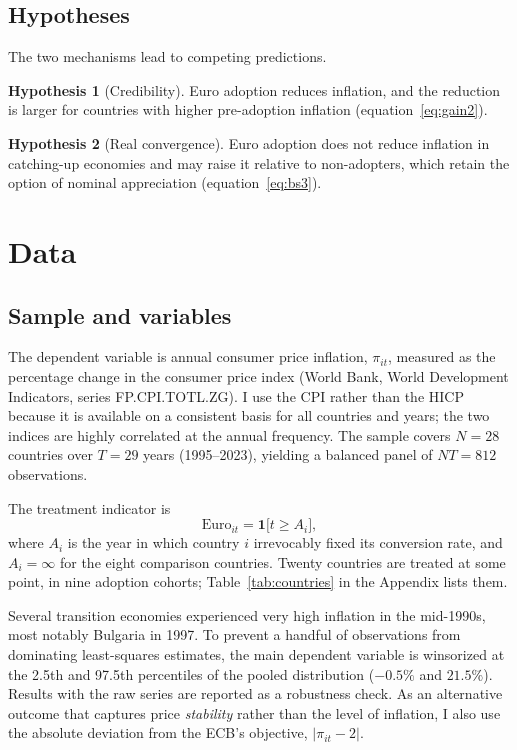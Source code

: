 \documentclass[11pt,a4paper]{article}
\numberwithin{equation}{section}
\theoremstyle{definition}
\newtheorem{hypothesis}{Hypothesis}
\theoremstyle{remark}
\begin{document}
\subsection{Hypotheses}
The two mechanisms lead to competing predictions.

\begin{hypothesis}[Credibility]\label{h1}
Euro adoption reduces inflation, and the reduction is larger for countries with higher pre-adoption inflation (equation~\ref{eq:gain2}).
\end{hypothesis}

\begin{hypothesis}[Real convergence]\label{h2}
Euro adoption does not reduce inflation in catching-up economies and may raise it relative to non-adopters, which retain the option of nominal appreciation (equation~\ref{eq:bs3}).
\end{hypothesis}

\section{Data}\label{sec:data}

\subsection{Sample and variables}
The dependent variable is annual consumer price inflation, $\pi_{it}$, measured as the percentage change in the consumer price index (World Bank, World Development Indicators, series FP.CPI.TOTL.ZG). I use the CPI rather than the HICP because it is available on a consistent basis for all countries and years; the two indices are highly correlated at the annual frequency. The sample covers $N=28$ countries over $T=29$ years (1995--2023), yielding a balanced panel of $NT=812$ observations.

The treatment indicator is
\begin{equation}
\text{Euro}_{it} = \mathbf{1}\big[t \geq A_i\big],
\end{equation}
where $A_i$ is the year in which country $i$ irrevocably fixed its conversion rate, and $A_i=\infty$ for the eight comparison countries. Twenty countries are treated at some point, in nine adoption cohorts; Table~\ref{tab:countries} in the Appendix lists them.

Several transition economies experienced very high inflation in the mid-1990s, most notably Bulgaria in 1997. To prevent a handful of observations from dominating least-squares estimates, the main dependent variable is winsorized at the 2.5th and 97.5th percentiles of the pooled distribution ($-0.5\%$ and $21.5\%$). Results with the raw series are reported as a robustness check. As an alternative outcome that captures price \emph{stability} rather than the level of inflation, I also use the absolute deviation from the ECB's objective, $|\pi_{it}-2|$.
\end{document}
